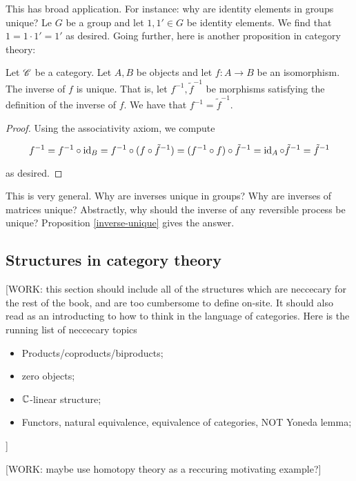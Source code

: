 This has broad application. For instance: why are identity elements in groups unique? Le $G$ be a group and let $1,1'\in G$ be identity elements. We find that $1=1\cdot 1' = 1'$ as desired. Going further, here is another proposition in category theory:

\begin{proposition}
\label{inverse-unique}
Let $\mathscr{C}$ be a category. Let $A,B$ be objects and let $f:A\to B$ be an isomorphism. The inverse of $f$ is unique. That is, let $f^{-1},\tilde{f}^{-1}$ be morphisms satisfying the definition of the inverse of $f$. We have that $f^{-1}=\tilde{f}^{-1}$.
\end{proposition}
\begin{proof} Using the associativity axiom, we compute

$$f^{-1}=f^{-1}\circ \operatorname{id} _{B} = f^{-1}\circ (f \circ \tilde{f}^{-1})=(f^{-1}\circ f)\circ \tilde{f}^{-1}=\operatorname{id}_A \circ \tilde{f}^{-1}=\tilde{f}^{-1}$$

as desired.
\end{proof}

This is very general. Why are inverses unique in groups? Why are inverses of matrices unique? Abstractly, why should the inverse of any reversible process be unique? Proposition \ref{inverse-unique} gives the answer.

\subsection{Structures in category theory}



[WORK: this section should include all of the structures which are neccecary for the rest of the book,
and are too cumbersome to define on-site. It should also read as an introducting to how to think in the language of categories. Here is the running list of neccecary topics

\begin{itemize}
\item Products/coproducts/biproducts;
\item zero objects;
\item $\mathbb{C}$-linear structure;
\item Functors, natural equivalence, equivalence of categories, NOT Yoneda lemma;
\end{itemize}
]

[WORK: maybe use homotopy theory as a reccuring motivating example?]

